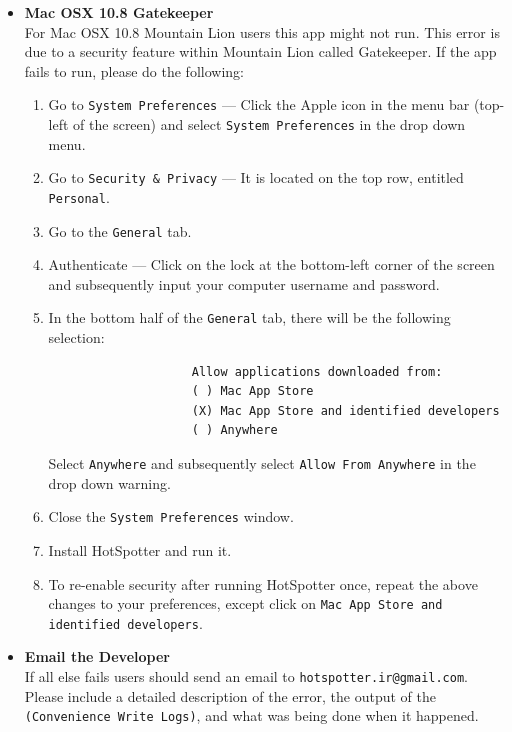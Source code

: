 \documentclass[a4paper,10pt]{article}
\makeatletter
\newcommand{\developeremail}{{\tt hotspotter.ir@gmail.com}}
\makeatother
\begin{document}
\begin{itemize}
    \item \textbf{Mac OSX 10.8 Gatekeeper}\\ For Mac OSX 10.8 Mountain
      Lion users this app might not run.  This error is due to a
      security feature within Mountain Lion called Gatekeeper.  If the
      app fails to run, please do the following:
        \begin{enumerate}
            \item Go to {\tt System Preferences} --- Click the Apple icon in the menu bar (top-left of the screen) and select {\tt System Preferences} in the drop down menu.
            \item Go to {\tt Security \& Privacy} --- It is located on the top row, entitled {\tt Personal}.
            \item Go to the {\tt General} tab.
            \item Authenticate --- Click on the lock at the bottom-left corner of the screen and subsequently input your computer username and password.
            \item In the bottom half of the {\tt General} tab, there will be the following selection:
                \begin{Verbatim}
                    Allow applications downloaded from:
                    ( ) Mac App Store
                    (X) Mac App Store and identified developers
                    ( ) Anywhere

                \end{Verbatim}

                Select {\tt Anywhere} and subsequently select {\tt Allow From Anywhere} in the drop down warning.

            \item Close the {\tt System Preferences} window.
            \item Install HotSpotter and run it.
            \item To re-enable security after running HotSpotter once,
                repeat the above changes to your preferences, except click on
                \texttt{Mac App Store and identified developers}.
        \end{enumerate}


    \item \textbf{Email the Developer}\\
        If all else fails users should send an email to \developeremail{}.
        Please include a detailed description of the error, the output of the {\tt
            (Convenience \textrightarrow{} Write Logs)}, and what was being done when it
            happened.\\
    \end{itemize}
\end{document}
